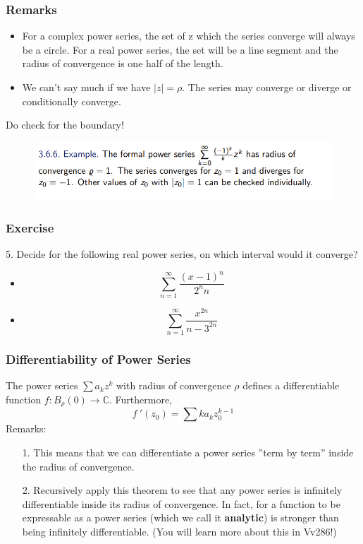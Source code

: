 \documentclass{beamer}
\begin{document}
\begin{frame}
    \frametitle{Remarks}
    \begin{itemize}
        \item For a complex power series, the set of z which the series converge
        will always be a circle. For a real power series, the set will be a line
        segment and the radius of convergence is one half of the length.
        \item We can’t say much if we have $|z| = \rho$. The series may converge or
        diverge or conditionally converge.        
    \end{itemize}
    \vspace{1em}
    Do check for the boundary!
    \begin{figure}
    \centering
    \includegraphics[width=1\textwidth]{boundary.png}
    \end{figure}
\end{frame}
\begin{frame}
    \frametitle{Exercise}
5. Decide for the following real power series, on which interval would it
converge?
\vspace{1em}
\begin{itemize}
    \item $$\sum_{n=1}^\infty \frac{(x-1)^n}{2^n n}$$
    \item $$\sum_{n=1}^\infty \frac{x^{2n}}{n-3^{2n}}$$
\end{itemize}
\end{frame}
\begin{frame}
    \frametitle{Differentiability of Power Series}
    \hspace{1em}
    The power series $\sum a_k z^k$ with radius of convergence $\rho$ 
    defines a differentiable function $f : B_\rho(0) \to \mathbb{C}$. Furthermore,
    $$f~'(z_0)=\sum k a_k z_0^{k-1}$$
    Remarks:
    \begin{itemize}
        \item[1.] This means that we can differentiate a power series ”term by term”
        inside the radius of convergence.
        \item[2.] Recursively apply this theorem to see that any power series is
        infinitely differentiable inside its radius of convergence. In fact, for a
        function to be expressable as a power series (which we call it
        \textbf{analytic}) is stronger than being infinitely differentiable. (You will
        learn more about this in Vv286!)
    \end{itemize}
\end{frame}
\end{document}
